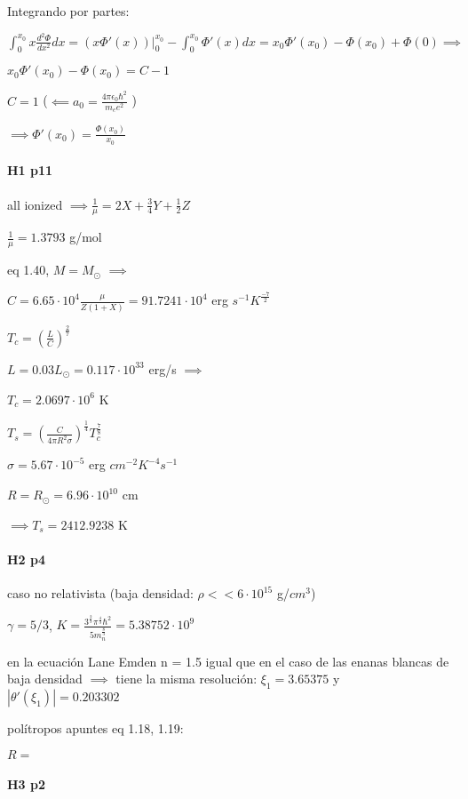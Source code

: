 \documentclass[12pt]{book}
\begin{document}
Integrando por partes:

$\int_0^{x_0}{x \frac{d^2\Phi}{dx^2} dx } = (x \Phi'(x))|_0^{x_0} - \int_0^{x_0}{\Phi'(x) dx } = x_0 \Phi'(x_0) - \Phi(x_0) + \Phi(0) \implies$

$x_0 \Phi'(x_0) - \Phi(x_0) = C - 1$

$C = 1$ ($\impliedby a_0 = \frac{4 \pi \epsilon_0 \hbar^2}{m_e e^2}$ )

 
$\implies  \Phi'(x_0) = \frac{ \Phi(x_0)}{x_0}$

\paragraph{H1 p11}


all ionized $\implies \frac{1}{\mu} = 2 X + \frac{3}{4} Y + \frac{1}{2} Z$

$\frac{1}{\mu}  = 1.3793$ g/mol

eq 1.40, $M = M_{\odot}$ $\implies$

$C = 6.65 \cdot 10^4 \frac{\mu}{Z(1+X)} = 91.7241 \cdot 10^4$ erg $s^{-1} K^{\frac{-7}{2}}$ 

$T_c = (\frac{L}{C})^{\frac{2}{7}}$

$L = 0.03 L_{\odot} = 0.117 \cdot 10^{33} $ erg/s $\implies$

$T_c = 2.0697 \cdot 10^6$ K

$T_s = (\frac{C}{4 \pi R^2 \sigma})^{\frac{1}{4}} T_c^{\frac{7}{8}}$

$\sigma = 5.67 \cdot 10^{-5}$ erg $cm^{-2} K^{-4} s^{-1}$

$R = R_{\odot} = 6.96 \cdot 10^{10}$ cm

$\implies T_s = 2412.9238$ K


\paragraph{H2 p4}

caso no relativista (baja densidad: $\rho << 6  \cdot 10^{15} $ g/$cm^3$)

$\gamma = 5/3$, $K = \frac{3^{\frac{2}{3}} \pi^{\frac{4}{3}} \hbar^2 }{5 m_n^{\frac{8}{3}}} = 5.38752 \cdot 10^9$

en la ecuación Lane Emden n = 1.5 igual que en el caso de las enanas blancas  de baja densidad $\implies $ tiene la misma resolución:
$\xi_1= 3.65375$ y $|\theta'(\xi_1)|= 0.203302$  

polítropos apuntes eq 1.18, 1.19:

$R = $


\paragraph{H3 p2}
\end{document}
